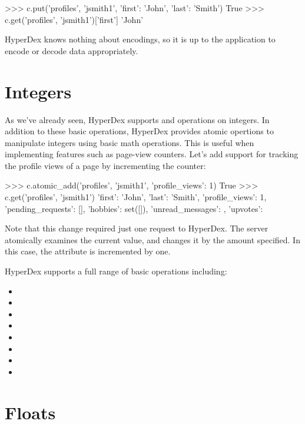 \begin{pythoncode}
>>> c.put('profiles', 'jsmith1', {'first': 'John', 'last': 'Smith'})
True
>>> c.get('profiles', 'jsmith1')['first']
'John'
\end{pythoncode}

HyperDex knows nothing about encodings, so it is up to the application to encode
or decode data appropriately.

\section{Integers}

As we've already seen, HyperDex supports  and  operations on
integers.  In addition to these basic operations, HyperDex provides atomic
opertions to manipulate integers using basic math operations.  This is useful
when implementing features such as page-view counters.  Let's add support for
tracking the profile views of a page by incrementing the counter:

\begin{pythoncode}
>>> c.atomic_add('profiles', 'jsmith1', {'profile_views': 1})
True
>>> c.get('profiles', 'jsmith1')
{'first': 'John', 'last': 'Smith',
 'profile_views': 1,
 'pending_requests': [],
 'hobbies': set([]),
 'unread_messages': {},
 'upvotes': {}}
\end{pythoncode}

Note that this change required just one request to HyperDex.  The server
atomically examines the current value, and changes it by the amount specified.
In this case, the  attribute is incremented by one.

HyperDex supports a full range of basic operations including:
\begin{itemize}[noitemsep,nolistsep]
\item {}
\item {}
\item {}
\item {}
\item {}
\item {}
\item {}
\item {}
\end{itemize}

\section{Floats}

